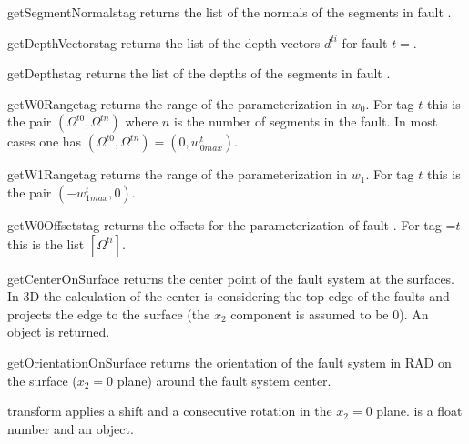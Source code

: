 \begin{methoddesc}[FaultSystem]{getSegmentNormals}{tag}
returns the list of the normals of the segments in fault .
\end{methoddesc}

\begin{methoddesc}[FaultSystem]{getDepthVectors}{tag}
returns the list of the depth vectors $d^{ti}$ for fault $t=$.
\end{methoddesc}

\begin{methoddesc}[FaultSystem]{getDepths}{tag}
returns the list of the depths of the segments in fault .
\end{methoddesc}

\begin{methoddesc}[FaultSystem]{getW0Range}{tag}
returns the range of the parameterization in $w_{0}$.
For tag $t$ this is the pair $(\Omega^{t0},\Omega^{tn})$ where $n$ is the
number of segments in the fault.
In most cases one has $(\Omega^{t0},\Omega^{tn})=(0,w^t_{0 max})$.
\end{methoddesc}

\begin{methoddesc}[FaultSystem]{getW1Range}{tag}
returns the range of the parameterization in  $w_{1}$.
For tag $t$ this is the pair $(-w^t_{1max},0)$.
\end{methoddesc}

\begin{methoddesc}[FaultSystem]{getW0Offsets}{tag}
returns the offsets for the parameterization of fault .
For tag =$t$ this is the list $[\Omega^{ti}]$.
\end{methoddesc}

\begin{methoddesc}[FaultSystem]{getCenterOnSurface}{}
returns the center point of the fault system at the surfaces.
In 3D the calculation of the center is considering the top edge of the faults
and projects the edge to the surface (the $x_{2}$ component is assumed to be
0). An \numpyNDA object is returned.
\end{methoddesc}

\begin{methoddesc}[FaultSystem]{getOrientationOnSurface}{}
returns the orientation of the fault system in RAD on the surface
($x_{2}=0$ plane) around the fault system center.
\end{methoddesc}

\begin{methoddesc}[FaultSystem]{transform}{}
applies a shift  and a consecutive rotation in the $x_{2}=0$ plane.
 is a float number and  an \numpyNDA object.
\end{methoddesc}

